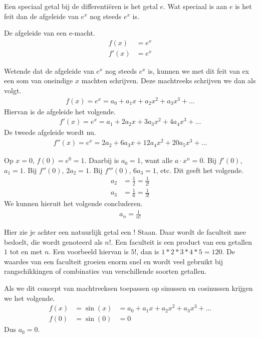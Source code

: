 \documentclass[11pt,fleqn]{book} %
\begin{document}
Een speciaal getal bij de differentiëren is het getal $e$. Wat speciaal is aan $e$ is het feit dan de afgeleide van $e^x$ nog steeds $e^x$ is.
\begin{definition}
De afgeleide van een e-macht.
\begin{align*}
f(x) &=e^x\\
f'(x) &=e^x
\end{align*}
\end{definition}

Wetende dat de afgeleide van $e^x$ nog steeds $e^x$ is, kunnen we met dit feit van ex een som van oneindige $x$ machten schrijven. Deze machtreeks schrijven we dan als volgt.
\begin{align*}
f(x)=e^x=a_0+a_1x+a_2x^2+a_3x^3+\ldots
\end{align*}
Hiervan is de afgeleide het volgende.
\begin{align*}
f'(x)=e^x=a_1+2a_2x+3a_3x^2+4a_4x^3+\ldots
\end{align*}
De tweede afgeleide wordt nu.
\begin{align*}
f''(x)=e^x=2a_2+6a_3x+12a_4x^2+20a_5x^3+\ldots
\end{align*}

Op $x=0$, $f(0)=e^0=1$. Daarbij is $a_0=1$, want alle $a\cdot x^n=0$. Bij $f'(0)$, $a_1=1$. Bij $f''(0)$, $2a_2=1$. Bij $f'''(0)$, $6a_3=1$, etc. Dit geeft het volgende.
\begin{align*}
a_2 &=\frac{1}{2}=\frac{1}{2!}\\
a_3 &=\frac{1}{6}=\frac{1}{3!}
\end{align*}
We kunnen hieruit het volgende concluderen.
\begin{align*}
a_n=\frac{1}{n!}
\end{align*}

Hier zie je achter een natuurlijk getal een $!$ Staan. Daar wordt de faculteit mee bedoelt, die wordt genoteerd als $n!$. Een faculteit is een product van een getallen $1$ tot en met $n$. Een voorbeeld hiervan is $5!$, dan is $1*2*3*4*5= 120$. De waardes van een faculteit groeien enorm snel en wordt veel gebruikt bij rangschikkingen of combinaties van verschillende soorten getallen.

Als we dit concept van machtreeksen toepassen op sinussen en cosinussen krijgen we het volgende.
\begin{align*}
f(x) &=\sin{(x)} &=a_0+a_1x+a_2x^2+a_3x^3+\ldots\\
f(0) &=\sin{(0)} &=0
\end{align*}
Dus $a_0=0$.
\end{document}
